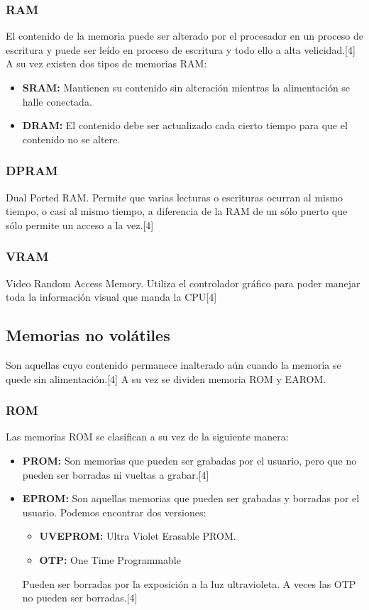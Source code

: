 \subsubsection{RAM}
El contenido de la memoria puede ser alterado por el procesador en un proceso de escritura y puede ser leído en proceso de escritura y todo ello a alta velicidad.[4]
A su vez existen dos tipos de memorias RAM:
    \begin{itemize}
        \item \textbf{SRAM:} Mantienen su contenido sin alteración mientras la alimentación se halle conectada.
        
        \item \textbf{DRAM:} El contenido debe ser actualizado cada cierto tiempo para que el contenido no se altere.
    \end{itemize}
    
\subsubsection{DPRAM}
Dual Ported RAM. Permite que varias lecturas o escrituras ocurran al mismo tiempo, o casi al mismo tiempo, a diferencia de la RAM de un sólo puerto que sólo permite un acceso a la vez.[4]

\subsubsection{VRAM}
Video Random Access Memory. Utiliza el controlador gráfico para poder manejar toda la información visual que manda la CPU[4]

\subsection{Memorias no volátiles}
Son aquellas cuyo contenido permanece inalterado aún cuando la memoria se quede sin alimentación.[4]
A su vez se dividen memoria ROM y EAROM.
\subsubsection{ROM}
Las memorias ROM se clasifican a su vez de la siguiente manera:
\begin{itemize}
    \item \textbf{PROM:} Son memorias que pueden ser grabadas por el usuario, pero que no pueden ser borradas ni vueltas a grabar.[4]
    
    \item \textbf{EPROM:} Son aquellas memorias que pueden ser grabadas y borradas por el usuario. Podemos encontrar dos versiones:
    \begin{itemize}
        \item \textbf{UVEPROM:} Ultra Violet Erasable PROM. 
        \item \textbf{OTP:} One Time Programmable
    \end{itemize}
    Pueden ser borradas por la exposición a la luz ultravioleta. A veces las OTP no pueden ser borradas.[4]
\end{itemize}

